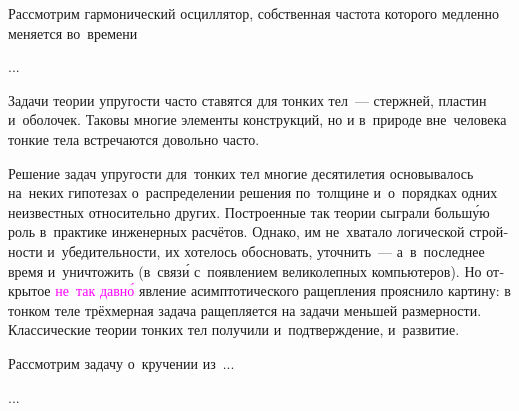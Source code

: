 

\begin{otherlanguage}{russian}

Рассмотрим гармонический осциллятор, собственная частота которого медленно меняется во~времени

...



\end{otherlanguage}



\begin{otherlanguage}{russian}

Задачи теории упругости часто ставятся для тонких тел~--- стержней, пластин и~оболочек. Таковы многие элементы конструкций, но и в~природе вне~человека тонкие тела встречаются довольно часто.

Решение задач упругости для~тонких тел многие десятилетия основывалось на~неких гипотезах о~распределении решения по~толщине и~о~порядках одних неизвестных относительно других. Построенные так теории сыграли больш\'{у}ю роль в~практике инженерных расчётов. Однако, им не~хватало логической стройности и~убедительности, их хотелось обосновать, уточнить~--- а~в~последнее время и~уничтожить (в~связ\'{и} с~появлением великолепных компьютеров). Но открытое \textcolor{magenta}{не~так давн\'{о}} явление асимптотического ращепления прояснило картину: в тонком теле трёхмерная задача ращепляется на задачи меньшей размерности. Классические теории тонких тел получили и~подтверждение, и~развитие.

Рассмотрим задачу о~кручении из~...

...




\end{otherlanguage}

